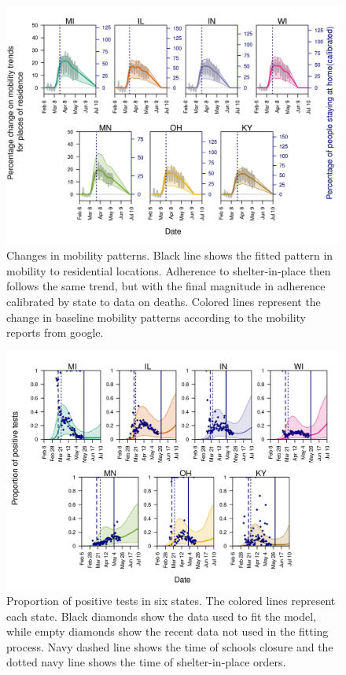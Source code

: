 \documentclass[11pt]{article}
\begin{document}
\begin{figure}[hb!]
\centering
\includegraphics[width=\textwidth]{../figures/report_figure_shelter_patterns.jpeg} 
\caption{\label{fig_google_shelter} Changes in mobility patterns. Black line shows the fitted pattern in mobility to residential locations. Adherence to shelter-in-place then follows the same trend, but with the final magnitude in adherence calibrated by state to data on deaths. Colored lines represent the change in baseline mobility patterns according to the mobility reports from google.}
\end{figure}

\begin{figure}[hb!]
\centering
\includegraphics[width=\textwidth]{../figures/report_figure_positive_tests.jpeg} 
\caption{\label{fig_deaths_forecast} Proportion of positive tests in six states. The colored lines represent each state. Black diamonds show the data used to fit the model, while empty diamonds show the recent data not used in the fitting process. Navy dashed line shows the time of schools closure and the dotted navy line shows the time of shelter-in-place orders.}
\end{figure}
\end{document}
